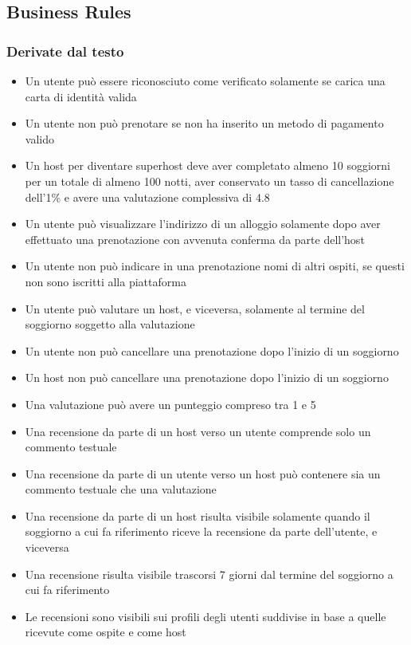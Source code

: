 \subsection{Business Rules}
\subsubsection{Derivate dal testo}
\begin{itemize}
  \item Un utente può essere riconosciuto come verificato solamente se carica una carta di identità valida
  \item Un utente non può prenotare se non ha inserito un metodo di pagamento valido
  \item Un host per diventare superhost deve aver completato almeno 10 soggiorni per un totale di almeno 100 notti, aver conservato un tasso di cancellazione dell'1\% e avere una valutazione complessiva di 4.8 
  \item Un utente può visualizzare l'indirizzo di un alloggio solamente dopo aver effettuato una prenotazione con avvenuta conferma da parte dell'host
  \item Un utente non può indicare in una prenotazione nomi di altri ospiti, se questi non sono iscritti alla piattaforma 
  \item Un utente può valutare un host, e viceversa, solamente al termine del soggiorno soggetto alla valutazione
  \item Un utente non può cancellare una prenotazione dopo l'inizio di un soggiorno
  \item Un host non può cancellare una prenotazione dopo l'inizio di un soggiorno
  \item Una valutazione può avere un punteggio compreso tra 1 e 5
  \item Una recensione da parte di un host verso un utente comprende solo un commento testuale
  \item Una recensione da parte di un utente verso un host può contenere sia un commento testuale che una valutazione
  \item Una recensione da parte di un host risulta visibile solamente quando il soggiorno a cui fa riferimento riceve la recensione da parte dell'utente, e viceversa
  \item Una recensione risulta visibile trascorsi 7 giorni dal termine del soggiorno a cui fa riferimento
  \item Le recensioni sono visibili sui profili degli utenti suddivise in base a quelle ricevute come ospite e come host
\end{itemize}

